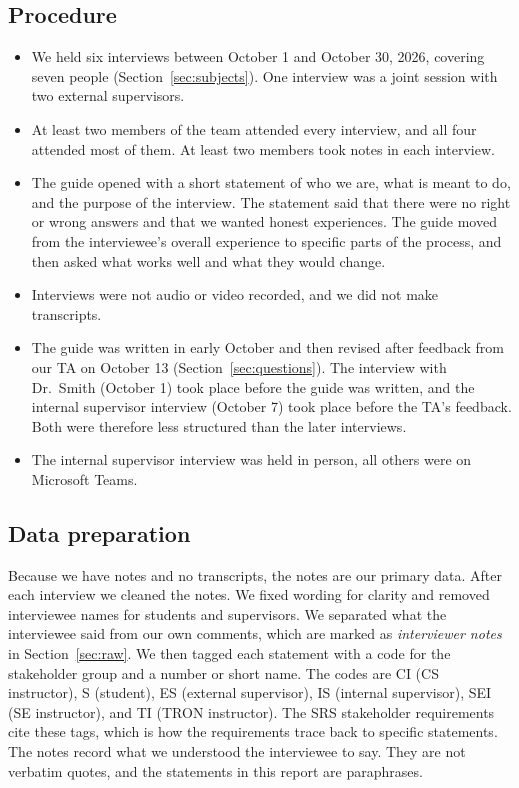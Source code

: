 \documentclass{article}
\begin{document}
    \subsection{Procedure}

    \begin{itemize}
        \item We held six interviews between October 1 and October 30, 2026,
        covering seven people (Section~\ref{sec:subjects}). One interview was a
        joint session with two external supervisors.
        \item At least two members of the team attended every interview, and all
        four attended most of them. At least two members took notes in each
        interview.
        \item The guide opened with a short statement of who we are, what
        \projname{} is meant to do, and the purpose of the interview. The statement
        said that there were no right or wrong answers and that we wanted honest
        experiences. The guide moved from the interviewee's overall experience to
        specific parts of the process, and then asked what works well and what they
        would change.
        \item Interviews were not audio or video recorded, and we did not make
        transcripts.
        \item The guide was written in early October and then revised after
        feedback from our TA on October 13 (Section~\ref{sec:questions}). The
        interview with Dr.~Smith (October 1) took place before the guide was
        written, and the internal supervisor interview (October 7) took place
        before the TA's feedback. Both were therefore less structured than the
        later interviews.
        \item The internal supervisor interview was held in person, all others were on Microsoft Teams.
    \end{itemize}

    \subsection{Data preparation}

    Because we have notes and no transcripts, the notes are our primary data.
    After each interview we cleaned the notes. We fixed wording for clarity and
    removed interviewee names for students and supervisors. We separated what
    the interviewee said from our own comments, which are marked as
    \emph{interviewer notes} in Section~\ref{sec:raw}. We then
    tagged each statement with a code for the stakeholder group and a number or short name.
    The codes are CI (CS instructor), S (student), ES (external supervisor),
    IS (internal supervisor), SEI (SE instructor), and TI (TRON instructor). The SRS stakeholder
    requirements cite these tags, which is how the requirements trace back to specific
    statements. The notes record what we understood the interviewee to say. They are not
    verbatim quotes, and the statements in this report are paraphrases.
\end{document}

